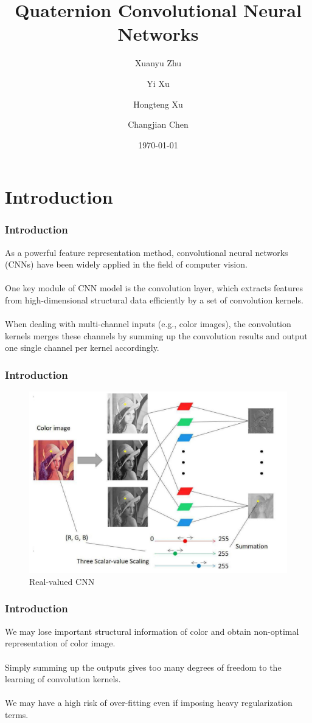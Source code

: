 \documentclass{beamer}
\title{Quaternion Convolutional Neural Networks}
\author{Xuanyu Zhu\and Yi Xu \and  Hongteng Xu\and Changjian Chen}
\date{\today}
\begin{document}
\begin{frame}
    \titlepage
\end{frame}


\section{Introduction}
\begin{frame}
    \frametitle{Introduction}

    As a powerful feature representation method, convolutional neural networks (CNNs) have been widely applied in the field of computer vision. 
    \\~\\
    One key module of CNN model is the convolution layer, which extracts features from high-dimensional structural data efficiently by a set of convolution kernels. 
    \\~\\
    When dealing with multi-channel inputs (e.g., color images), the convolution kernels merges these channels by summing up the convolution results and output one single channel per kernel accordingly.
\end{frame}


\begin{frame}
    \frametitle{Introduction}
    \begin{figure}[H]
        \centering
        \includegraphics[width=.7\textwidth]{img/pic1.jpg}
        \caption{Real-valued CNN}
    \end{figure}
\end{frame}

\begin{frame}
    \frametitle{Introduction}

    We may lose important structural information of color and obtain non-optimal representation of color image.
    \\~\\
    Simply summing up the outputs gives too many degrees of freedom to the learning of convolution kernels.
    \\~\\
    We may have a high risk of over-fitting even if imposing heavy regularization terms.
\end{frame}
\end{document}
